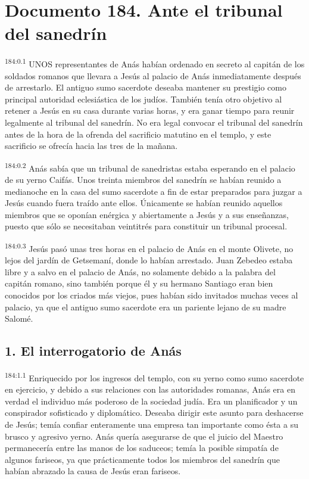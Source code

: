 \chapter{Documento 184. Ante el tribunal del sanedrín}
\par
\textsuperscript{184:0.1} UNOS representantes de Anás habían ordenado en secreto al capitán de los soldados romanos que llevara a Jesús al palacio de Anás inmediatamente después de arrestarlo. El antiguo sumo sacerdote deseaba mantener su prestigio como principal autoridad eclesiástica de los judíos. También tenía otro objetivo al retener a Jesús en su casa durante varias horas, y era ganar tiempo para reunir legalmente al tribunal del sanedrín. No era legal convocar el tribunal del sanedrín antes de la hora de la ofrenda del sacrificio matutino en el templo, y este sacrificio se ofrecía hacia las tres de la mañana.

\par
\textsuperscript{184:0.2} Anás sabía que un tribunal de sanedristas estaba esperando en el palacio de su yerno Caifás. Unos treinta miembros del sanedrín se habían reunido a medianoche en la casa del sumo sacerdote a fin de estar preparados para juzgar a Jesús cuando fuera traído ante ellos. Únicamente se habían reunido aquellos miembros que se oponían enérgica y abiertamente a Jesús y a sus enseñanzas, puesto que sólo se necesitaban veintitrés para constituir un tribunal procesal.

\par
\textsuperscript{184:0.3} Jesús pasó unas tres horas en el palacio de Anás en el monte Olivete, no lejos del jardín de Getsemaní, donde lo habían arrestado. Juan Zebedeo estaba libre y a salvo en el palacio de Anás, no solamente debido a la palabra del capitán romano, sino también porque él y su hermano Santiago eran bien conocidos por los criados más viejos, pues habían sido invitados muchas veces al palacio, ya que el antiguo sumo sacerdote era un pariente lejano de su madre Salomé.

\section*{1. El interrogatorio de Anás}
\par
\textsuperscript{184:1.1} Enriquecido por los ingresos del templo, con su yerno como sumo sacerdote en ejercicio, y debido a sus relaciones con las autoridades romanas, Anás era en verdad el individuo más poderoso de la sociedad judía. Era un planificador y un conspirador sofisticado y diplomático. Deseaba dirigir este asunto para deshacerse de Jesús; temía confiar enteramente una empresa tan importante como ésta a su brusco y agresivo yerno. Anás quería asegurarse de que el juicio del Maestro permanecería entre las manos de los saduceos; temía la posible simpatía de algunos fariseos, ya que prácticamente todos los miembros del sanedrín que habían abrazado la causa de Jesús eran fariseos.

